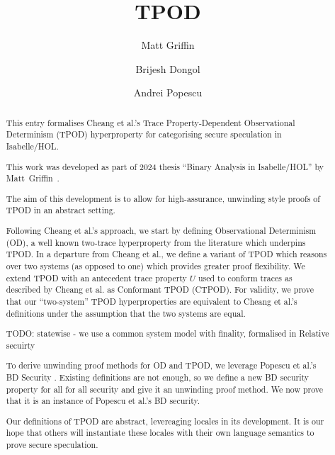 \documentclass[11pt,a4paper]{article}
\begin{document}
\title{TPOD}
\author{Matt Griffin \and Brijesh Dongol \and Andrei Popescu}
\maketitle

\begin{abstract}
  This entry formalises Cheang et al.'s Trace Property-Dependent Observational Determinism (TPOD)
  hyperproperty for categorising secure speculation in Isabelle/HOL. 

  This work was developed as part of 2024 thesis ``Binary Analysis in Isabelle/HOL'' by 
  Matt~Griffin~\cite{LNCS2283}.

  The aim of this development is to allow for high-assurance, unwinding style proofs of TPOD in an
  abstract setting.

  Following Cheang et al.'s approach, we start by defining Observational Determinism (OD), a well
  known two-trace hyperproperty from the literature which underpins TPOD.
  In a departure from Cheang et al., we define a variant of TPOD which reasons over 
  two systems (as opposed to one) which provides greater proof flexibility.
  We extend TPOD with an antecedent trace property $U$ used to conform traces as described by 
  Cheang et al. as Conformant TPOD (CTPOD).
  For validity, we prove that our ``two-system'' TPOD hyperproperties are equivalent to 
  Cheang et al.'s definitions under the assumption that the two systems are equal.


  TODO: statewise - we use a common system model with finality, formalised in Relative secuirty

  To derive unwinding proof methods for OD and TPOD, we leverage Popescu et al.'s BD Security \cite{BD}.
  Existing definitions are not enough, so we define a new BD security property for all for all
security and give it an unwinding proof method.
We now prove that it is an instance of Popescu et al.'s BD security.


  Our definitions of TPOD are abstract, levereaging locales in its development.
  It is our hope that others will instantiate these locales with their own language semantics to 
  prove secure speculation.

\end{abstract}

\tableofcontents





\end{document}
